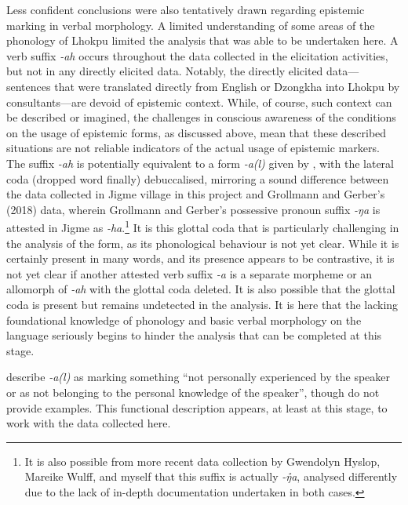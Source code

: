 Less confident conclusions were also tentatively drawn regarding epistemic marking in verbal morphology. A limited understanding of some areas of the phonology of Lhokpu limited the analysis that was able to be undertaken here. A verb suffix \textit{-ah} occurs throughout the data collected in the elicitation activities, but not in any directly elicited data. Notably, the directly elicited data---sentences that were translated directly from English or Dzongkha into Lhokpu by consultants---are devoid of epistemic context. While, of course, such context can be described or imagined, the challenges in conscious awareness of the conditions on the usage of epistemic forms, as discussed above, mean that these described situations are not reliable indicators of the actual usage of epistemic markers. The suffix \textit{-ah} is potentially equivalent to a form \textit{-a(l)} given by \cite{Grollmann2018}, with the lateral coda (dropped word finally) debuccalised, mirroring a sound difference between the data collected in Jigme village in this project and Grollmann and Gerber's (2018) data, wherein Grollmann and Gerber's possessive pronoun suffix \textit{-ŋa} is attested in Jigme as \textit{-ha}.\footnote{It is also possible from more recent data collection by Gwendolyn Hyslop, Mareike Wulff, and myself that this suffix is actually \textit{-ŋ̊a}, analysed differently due to the lack of in-depth documentation undertaken in both cases.} It is this glottal coda that is particularly challenging in the analysis of the form, as its phonological behaviour is not yet clear. While it is certainly present in many words, and its presence appears to be contrastive, it is not yet clear if another attested verb suffix \textit{-a} is a separate morpheme or an allomorph of \textit{-ah} with the glottal coda deleted. It is also possible that the glottal coda is present but remains undetected in the analysis. It is here that the lacking foundational knowledge of phonology and basic verbal morphology on the language seriously begins to hinder the analysis that can be completed at this stage.

\cite[20-21]{Grollmann2018} describe \textit{-a(l)} as marking something ``not personally experienced by the speaker or as not belonging to the personal knowledge of the speaker'', though do not provide examples. This functional description appears, at least at this stage, to work with the data collected here.

